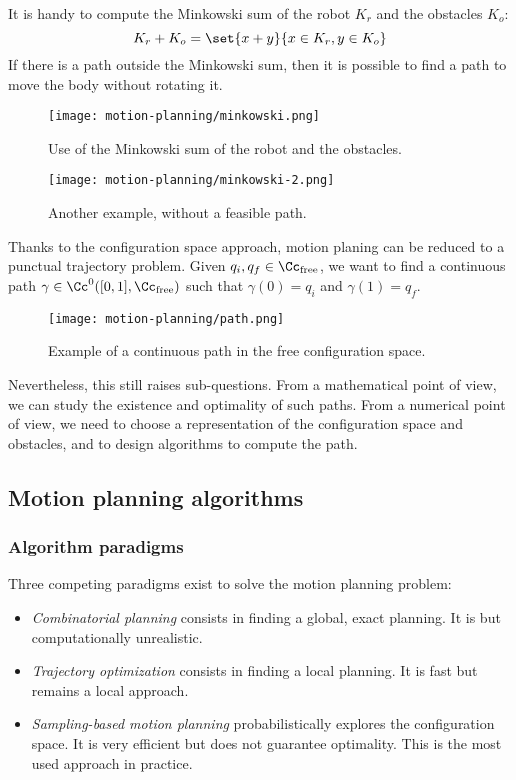 It is handy to compute the Minkowski sum of the robot $K_r$ and the obstacles $K_o$:
\begin{equation*}
    K_r + K_o = \set{x+y}{x\in K_r, y\in K_o}
\end{equation*}
If there is a path outside the Minkowski sum, then it is possible to find a path to move the body without rotating it.
\begin{figure}[H]
    \centering
    \texttt{[image: motion-planning/minkowski.png]}
    \caption{Use of the Minkowski sum of the robot and the obstacles.}
\end{figure}
\begin{figure}[H]
    \centering
    \texttt{[image: motion-planning/minkowski-2.png]}
    \caption{Another example, without a feasible path.}
\end{figure}
Thanks to the configuration space approach, motion planing can be reduced to a punctual trajectory problem. Given $q_i, q_f\in\Cc_{\text{free}}$, we want to find a continuous path $\gamma\in\Cc^0([0,1], \Cc_{\text{free}})$ such that $\gamma(0)=q_i$ and $\gamma(1)=q_f$.
\begin{figure}[H]
    \centering
    \texttt{[image: motion-planning/path.png]}
    \caption{Example of a continuous path in the free configuration space.}
\end{figure}
Nevertheless, this still raises sub-questions. From a mathematical point of view, we can study the existence and optimality of such paths. From a numerical point of view, we need to choose a representation of the configuration space and obstacles, and to design algorithms to compute the path.

\subsection{Motion planning algorithms}
\subsubsection{Algorithm paradigms}
Three competing paradigms exist to solve the motion planning problem:
\begin{itemize}
    \item \emph{Combinatorial planning} consists in finding a global, exact planning. It is  but computationally unrealistic.
    \item \emph{Trajectory optimization} consists in finding a local planning. It is fast but remains a local approach.
    \item \emph{Sampling-based motion planning} probabilistically explores the configuration space. It is very efficient but does not guarantee optimality. This is the most used approach in practice.
\end{itemize}

